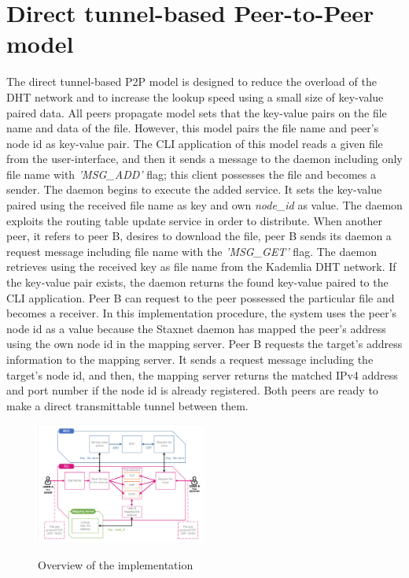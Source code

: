 \section{Direct tunnel-based Peer-to-Peer model}

The direct tunnel-based P2P model is designed to reduce the overload of the DHT network and to increase the lookup speed using a small size of key-value paired data. All peers propagate model sets that the key-value pairs on the file name and data of the file. However, this model pairs the file name and peer's node id as key-value pair. The CLI application of this model reads a given file from the user-interface, and then it sends a message to the daemon including only file name with \textit{'MSG\_ADD'} flag; this client possesses the file and becomes a sender. The daemon begins to execute the added service. It sets the key-value paired using the received file name as key and own \textit{node\_id} as value. The daemon exploits the routing table update service in order to distribute. When another peer, it refers to peer B, desires to download the file, peer B sends its daemon a request message including file name with the \textit{'MSG\_GET'} flag. The daemon retrieves using the received key as file name from the Kademlia DHT network. If the key-value pair exists, the daemon returns the found key-value paired to the CLI application. Peer B can request to the peer possessed the particular file and becomes a receiver. In this implementation procedure, the system uses the peer's node id as a value because the Staxnet daemon has mapped the peer's address using the own node id in the mapping server. Peer B requests the target's address information to the mapping server. It sends a request message including the target's node id, and then, the mapping server returns the matched IPv4 address and port number if the node id is already registered. Both peers are ready to make a direct transmittable tunnel between them.

\begin{figure}[!ht]
	\centering
	\includegraphics[width=0.5\textwidth]{images/fig_4_3.pdf}\\
	\caption{Overview of the implementation}
	\label{fig:implementation}
\end{figure}

